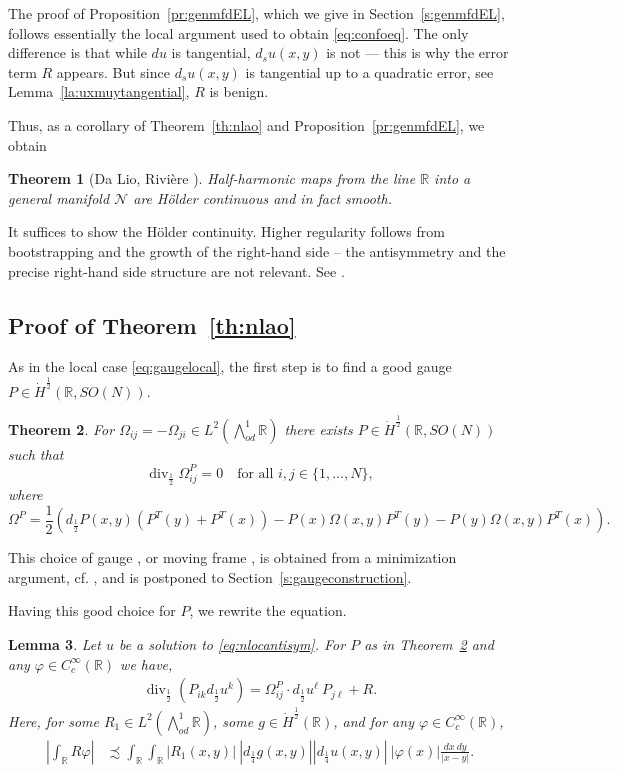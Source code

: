 \documentclass[12pt]{amsart}
\newtheorem{theorem}{Theorem}
\newtheorem{lemma}[theorem]{Lemma}
\theoremstyle{definition}
\newcommand{\R}{\mathbb{R}}
\newcommand{\brac}[1]{\left (#1 \right )}
\newcommand{\Ep}{\bigwedge\nolimits}
\numberwithin{theorem}{section} \numberwithin{equation}{section}
\renewcommand{\div}{\operatorname{div}}
\newcommand{\aleq}{\precsim}
\begin{document}
The proof of Proposition~\ref{pr:genmfdEL}, which we give in Section~\ref{s:genmfdEL}, follows essentially the local argument used to obtain \eqref{eq:confoeq}. The only difference is that while $d u$ is tangential, $d_su(x,y)$ is not --- this is why the error term
$R$ appears. But since $d_s u(x,y)$ is tangential up to a quadratic error, see Lemma~\ref{la:uxmuytangential}, $R$ is benign.

Thus, as a corollary of Theorem~\ref{th:nlao} and Proposition~\ref{pr:genmfdEL}, we obtain

\begin{theorem}[Da Lio, Rivi\`{e}re \cite{DaLio-Riviere-1Dmfd}]
Half-harmonic maps from the line $\R$ into a general manifold $\mathcal{N}$ are H\"older continuous and in fact smooth. 
\end{theorem}
It suffices to show the H\"older continuity. Higher regularity follows from bootstrapping and the growth of the right-hand side -- the antisymmetry and the precise right-hand side structure are not relevant. See \cite{Schikorra-eps}.

\subsection{Proof of Theorem~\ref{th:nlao}}
As in the local case \eqref{eq:gaugelocal}, the first step is to find a good gauge $P \in \dot{H}^{\frac{1}{2}}(\R,SO(N))$.
\begin{theorem}\label{th:gauge}
For $\Omega_{ij} = -\Omega_{ji} \in L^2(\Ep^1_{od}\R)$ there exists $P \in \dot{H}^{\frac{1}{2}}(\R,SO(N))$ such that
\[
 \div_{\frac{1}{2}} \Omega^P_{ij} = 0 \quad \mbox{for all }i,j \in \{1,\ldots,N\},
\]
where
\[
 \Omega^P = \frac{1}{2} \brac{d_{\frac{1}{2}}P(x,y) \brac{P^T(y) + P^T(x)} -  P(x) \Omega(x,y) P^T(y) - P(y) \Omega(x,y) P^T(x)}. 
\]
\end{theorem}
This choice of gauge \cite{Uhlenbeck-1982}, or moving frame \cite{Helein91}, is obtained from a minimization argument, cf. \cite{Schikorra-2010}, and is postponed to Section~\ref{s:gaugeconstruction}.

Having this good choice for $P$, we rewrite the equation.
% 
\begin{lemma}\label{la:gettingomegap}
Let $u$ be a solution to \eqref{eq:nlocantisym}. For $P$ as in Theorem~\ref{th:gauge} and any $\varphi \in C_c^\infty(\R)$ we have,
\[
\begin{split}
\div_{\frac{1}{2}} (P_{ik} d_{\frac{1}{2}} u^k) =\Omega_{ij}^P \cdot d_{\frac{1}{2}}u^\ell\ P_{j\ell} + R.
\end{split}
  \]
Here, for some $R_1 \in L^2(\Ep^1_{od}\R)$, some $g \in \dot{H}^{\frac{1}{2}}(\R)$, and for any $\varphi \in C_c^\infty(\R)$,
\[
\begin{split}
\left |\int_{\R} R \varphi \right |&\aleq \int_{\R}\int_{\R} |R_1(x,y)|\ |d_{\frac{1}{4}} g(x,y)| |d_{\frac{1}{4}}u(x,y)|\ |\varphi(x)| \frac{dx\ dy}{|x-y|}.
\end{split}
\]
\end{lemma}
\end{document}
